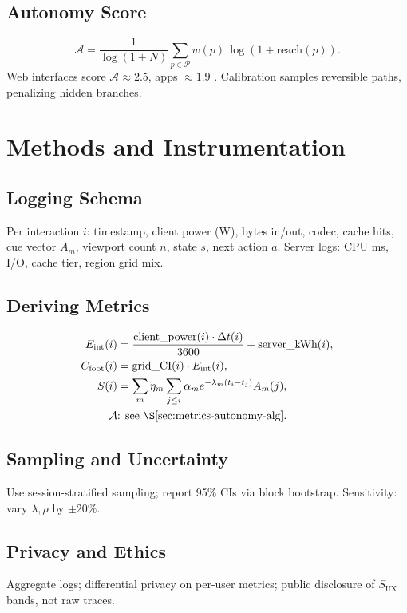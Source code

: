\documentclass[openany]{book}
\newcommand{\Sent}{S} %
\newcommand{\Eint}{E_{\mathrm{int}}} %
\newcommand{\Cfoot}{C_{\mathrm{foot}}} %
\newcommand{\Auton}{\mathcal{A}} %
\newcommand{\SUX}{S_{\mathrm{UX}}} %
\begin{document}
\section{Autonomy Score}
\label{sec:metrics-autonomy}
\begin{equation}
\label{eq:autonomy}
\Auton = \frac{1}{\log(1+N)}\sum_{p\in \mathcal{P}} w(p)\,\log(1+\mathrm{reach}(p)).
\end{equation}
Web interfaces score \(\Auton \approx 2.5\), apps \(\approx 1.9\) \citep{doctorow2022}. Calibration samples reversible paths, penalizing hidden branches.


\chapter{Methods and Instrumentation}
\label{ch:methods}

\section{Logging Schema}
\label{sec:methods-logging}
Per interaction $i$: timestamp, client power (W), bytes in/out, codec, cache hits, cue vector $A_m$, viewport count $n$, state $s$, next action $a$. Server logs: CPU ms, I/O, cache tier, region grid mix.

\section{Deriving Metrics}
\label{sec:methods-derive}
\begin{align}
\Eint(i)&= \frac{\text{client\_power}(i)\cdot\Delta t(i)}{3600} + \text{server\_kWh}(i),\\
\Cfoot(i)&= \mathrm{grid\_CI}(i)\cdot \Eint(i),\\
\Sent(i)&=\sum_m \eta_m \sum_{j\le i} \alpha_m e^{-\lambda_m (t_i-t_j)} A_m(j),\\
\Auton&\text{: see \S\ref{sec:metrics-autonomy-alg}.}
\end{align}

\section{Sampling and Uncertainty}
\label{sec:methods-uncertainty}
Use session-stratified sampling; report 95\% CIs via block bootstrap. Sensitivity: vary $\lambda,\rho$ by $\pm 20\%$.

\section{Privacy and Ethics}
\label{sec:methods-ethics}
Aggregate logs; differential privacy on per-user metrics; public disclosure of $\SUX$ bands, not raw traces.
\end{document}
